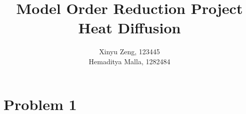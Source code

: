 \documentclass[12pt]{article}
\begin{document}
 
 
\title{%
  Model Order Reduction Project \\
  \large Heat Diffusion} 
 
 \author{ %
Xinyu Zeng, 123445 \\
Hemaditya Malla, 1282484
}
 
\maketitle
\tableofcontents
\pagebreak

\section*{Problem 1}
\end{document}

